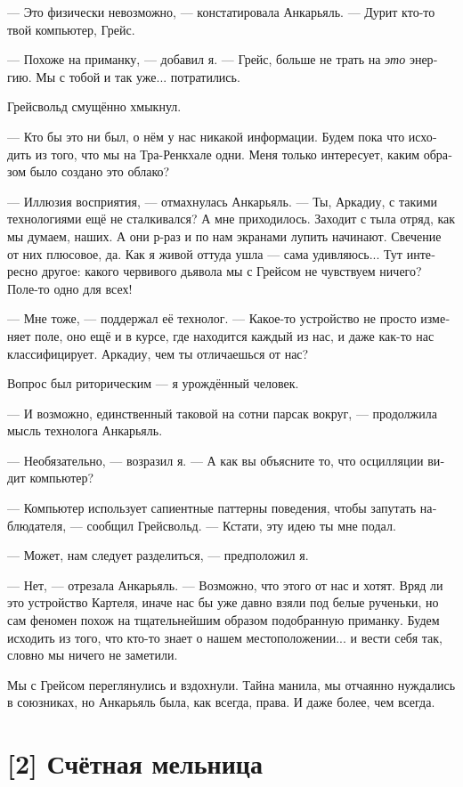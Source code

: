 \documentclass[a4paper,12pt,fleqn]{book}\usepackage{polyglossia}\setdefaultlanguage[babelshorthands=true]{russian}\setotherlanguage{english}\defaultfontfeatures{Ligatures=TeX,Mapping=tex-text}\usepackage{xcolor}\newcommand{\ml}[3]{#2}
\begin{document}
{--- Это физически невозможно, --- констатировала Анкарьяль.
--- Дурит кто-то твой компьютер, Грейс.

--- Похоже на приманку, --- добавил я.
--- Грейс, больше не трать на \emph{это} энергию.
Мы с тобой и так уже... потратились.

Грейсвольд смущённо хмыкнул.

--- Кто бы это ни был, о нём у нас никакой информации.
Будем пока что исходить из того, что мы на Тра-Ренкхале одни.
Меня только интересует, каким образом было создано это облако?

--- Иллюзия восприятия, --- отмахнулась Анкарьяль.
--- Ты, Аркадиу, с такими технологиями ещё не сталкивался?
А мне приходилось.
Заходит с тыла отряд, как мы думаем, наших.
А они р-раз и по нам экранами лупить начинают.
Свечение от них плюсовое, да.
Как я живой оттуда ушла --- сама удивляюсь...
Тут интересно другое: какого червивого дьявола мы с Грейсом не чувствуем ничего?
Поле-то одно для всех!

--- Мне тоже, --- поддержал её технолог.
--- Какое-то устройство не просто изменяет поле, оно ещё и в курсе, где находится каждый из нас, и даже как-то нас классифицирует.
Аркадиу, чем ты отличаешься от нас?

Вопрос был риторическим --- я урождённый человек.

--- И возможно, единственный таковой на сотни парсак вокруг, --- продолжила мысль технолога Анкарьяль.

--- Необязательно, --- возразил я.
--- А как вы объясните то, что осцилляции видит компьютер?

--- Компьютер использует сапиентные паттерны поведения, чтобы запутать наблюдателя, --- сообщил Грейсвольд.
--- Кстати, эту идею ты мне подал.

--- Может, нам следует разделиться, --- предположил я.

--- Нет, --- отрезала Анкарьяль.
--- Возможно, что этого от нас и хотят.
Вряд ли это устройство Картеля, иначе нас бы уже давно взяли под белые рученьки, но сам феномен похож на тщательнейшим образом подобранную приманку.
Будем исходить из того, что кто-то знает о нашем местоположении... и вести себя так, словно мы ничего не заметили.

Мы с Грейсом переглянулись и вздохнули.
Тайна манила, мы отчаянно нуждались в союзниках, но Анкарьяль была, как всегда, права.
И даже более, чем всегда.

\section{[2] Счётная мельница}

}
\end{document}

